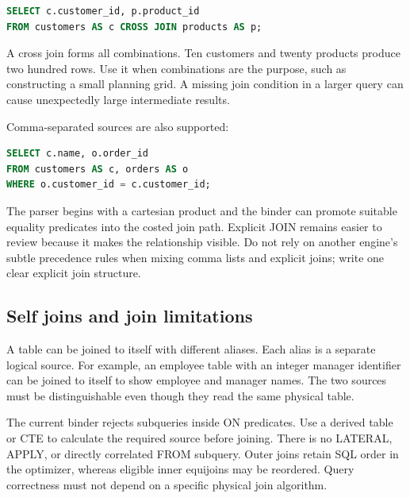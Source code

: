 \begin{lstlisting}[language=SQL]
SELECT c.customer_id, p.product_id
FROM customers AS c CROSS JOIN products AS p;
\end{lstlisting}

A cross join forms all combinations. Ten customers and twenty products produce two hundred rows. Use it when combinations are the purpose, such as constructing a small planning grid. A missing join condition in a larger query can cause unexpectedly large intermediate results.

Comma-separated sources are also supported:

\begin{lstlisting}[language=SQL]
SELECT c.name, o.order_id
FROM customers AS c, orders AS o
WHERE o.customer_id = c.customer_id;
\end{lstlisting}

The parser begins with a cartesian product and the binder can promote suitable equality predicates into the costed join path. Explicit JOIN remains easier to review because it makes the relationship visible. Do not rely on another engine's subtle precedence rules when mixing comma lists and explicit joins; write one clear explicit join structure.

\subsection{Self joins and join limitations}

A table can be joined to itself with different aliases. Each alias is a separate logical source. For example, an employee table with an integer manager identifier can be joined to itself to show employee and manager names. The two sources must be distinguishable even though they read the same physical table.

The current binder rejects subqueries inside ON predicates. Use a derived table or CTE to calculate the required source before joining. There is no LATERAL, APPLY, or directly correlated FROM subquery. Outer joins retain SQL order in the optimizer, whereas eligible inner equijoins may be reordered. Query correctness must not depend on a specific physical join algorithm.


